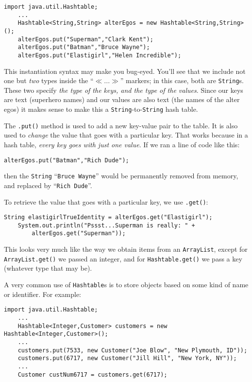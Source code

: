 \begin{Verbatim}[fontsize=\small,samepage=true,frame=single]
    import java.util.Hashtable;
    ...
    Hashtable<String,String> alterEgos = new Hashtable<String,String>();
    alterEgos.put("Superman","Clark Kent");
    alterEgos.put("Batman","Bruce Wayne");
    alterEgos.put("Elastigirl","Helen Incredible");
\end{Verbatim}

This instantiation syntax may make you bug-eyed. You'll see that we include
not one but \textit{two} types inside the ``$\ll...\gg$'' markers; in this
case, both are \texttt{String}s. These two specify \textit{the type of the
keys, and the type of the values}. Since our keys are text (superhero names)
and our values are also text (the names of the alter egos) it makes sense to
make this a \texttt{String}-to-\texttt{String} hash table.

The \texttt{.put()} method is used to add a new key-value pair to the table.
It is also used to \textit{change} the value that goes with a particular key.
That works because in a hash table, \textit{every key goes with just one
value}. If we ran a line of code like this:

\begin{Verbatim}[fontsize=\small,samepage=true,frame=single]
    alterEgos.put("Batman","Rich Dude");
\end{Verbatim}

then the \texttt{String} ``\texttt{Bruce Wayne}'' would be permanently removed
from memory, and replaced by ``\texttt{Rich Dude}''.

To retrieve the value that goes with a particular key, we use \texttt{.get()}:

\begin{Verbatim}[fontsize=\small,samepage=true,frame=single]
    String elastigirlTrueIdentity = alterEgos.get("Elastigirl");
    System.out.println("Pssst...Superman is really: " + 
        alterEgos.get("Superman"));
\end{Verbatim}

This looks very much like the way we obtain items from an \texttt{ArrayList},
except for \texttt{ArrayList.get()} we passed an integer, and for
\texttt{Hashtable.get()} we pass a key (whatever type that may be).

A very common use of \texttt{Hashtable}s is to store objects based on some
kind of name or identifier. For example:

\begin{Verbatim}[fontsize=\footnotesize,samepage=true,frame=single]
    import java.util.Hashtable;
    ...
    Hashtable<Integer,Customer> customers = new Hashtable<Integer,Customer>();
    ...
    customers.put(7533, new Customer("Joe Blow", "New Plymouth, ID"));
    customers.put(6717, new Customer("Jill Hill", "New York, NY"));
    ...
    Customer custNum6717 = customers.get(6717);
\end{Verbatim}

